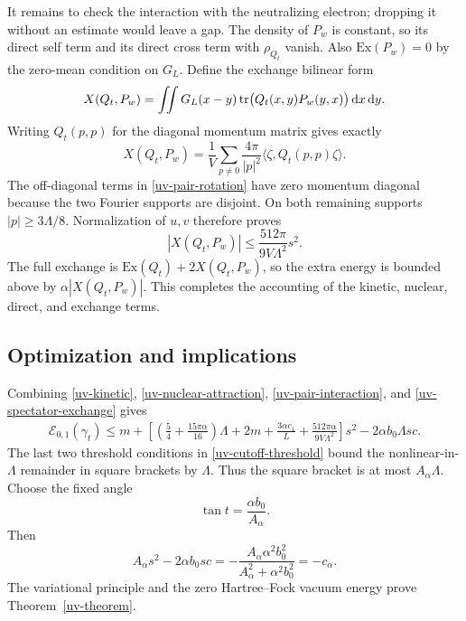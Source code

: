 It remains to check the interaction with the neutralizing electron; dropping
it without an estimate would leave a gap.  The density of $P_w$ is constant,
so its direct self term and its direct cross term with $\rho_{Q_t}$ vanish.
Also $\mathrm{Ex}(P_w)=0$ by the zero-mean condition on $G_L$.  Define the
exchange bilinear form
\[
 X(Q_t,P_w)=\iint G_L(x-y)
                 \operatorname{tr}\bigl(Q_t(x,y)P_w(y,x)\bigr)\,\mathrm d x\,\mathrm d y.
\]
Writing $Q_t(p,p)$ for the diagonal momentum matrix gives exactly
\[
 X(Q_t,P_w)=\frac1V\sum_{p\ne0}\frac{4\pi}{|p|^2}
                  \langle\zeta,Q_t(p,p)\zeta\rangle.
\]
The off-diagonal terms in \eqref{uv-pair-rotation} have zero momentum
diagonal because the two Fourier supports are disjoint.  On both remaining
supports $|p|\ge3\Lambda/8$.  Normalization of $u,v$ therefore proves
\begin{equation}
 |X(Q_t,P_w)|\le\frac{512\pi}{9V\Lambda^2}s^2.
 \label{uv-spectator-exchange}
\end{equation}
The full exchange is $\mathrm{Ex}(Q_t)+2X(Q_t,P_w)$, so the extra energy is
bounded above by $\alpha|X(Q_t,P_w)|$.  This completes the accounting of
the kinetic, nuclear, direct, and exchange terms.

\subsection{Optimization and implications}
\label{uv-conclusion}

Combining \eqref{uv-kinetic}, \eqref{uv-nuclear-attraction},
\eqref{uv-pair-interaction}, and \eqref{uv-spectator-exchange} gives
\begin{align}
 \mathcal E_{0,1}(\gamma_t)
 \le m+\left[
 \left(\frac54+\frac{15\pi\alpha}{16}\right)\Lambda
       +2m+\frac{3\alpha c_1}{L}
       +\frac{512\pi\alpha}{9V\Lambda^2}
       \right]s^2
       -2\alpha b_0\Lambda sc.
 \label{uv-energy-before-optimization}
\end{align}
The last two threshold conditions in \eqref{uv-cutoff-threshold} bound the
nonlinear-in-$\Lambda$ remainder in square brackets by $\Lambda$.
Thus the square bracket is at most $A_\alpha\Lambda$.  Choose the fixed
angle
\[
 \tan t=\frac{\alpha b_0}{A_\alpha}.
\]
Then
\[
 A_\alpha s^2-2\alpha b_0sc
 =-\frac{A_\alpha\alpha^2b_0^2}
             {A_\alpha^2+\alpha^2b_0^2}
 =-c_\alpha.
\]
The variational principle and the zero Hartree--Fock vacuum energy prove
Theorem~\ref{uv-theorem}.

